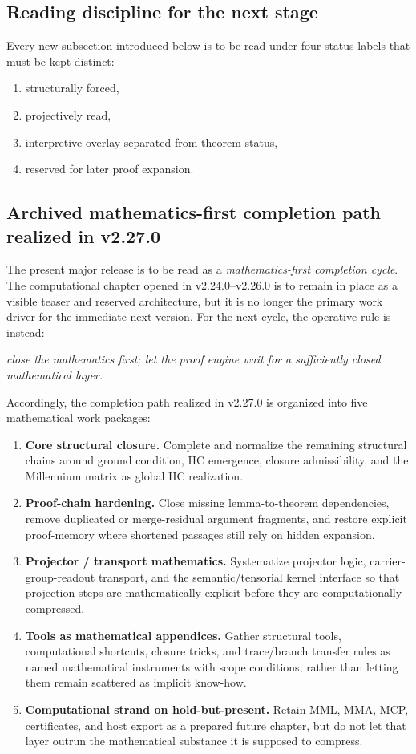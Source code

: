 \subsection*{Reading discipline for the next stage}
Every new subsection introduced below is to be read under four status labels that must be kept distinct:
\begin{enumerate}[leftmargin=2em,label=(\alph*)]
  \item structurally forced,
  \item projectively read,
  \item interpretive overlay separated from theorem status,
  \item reserved for later proof expansion.
\end{enumerate}


\subsection*{Archived mathematics-first completion path realized in v2.27.0}

The present major release is to be read as a \emph{mathematics-first completion cycle}. The computational chapter opened in v2.24.0--v2.26.0 is to remain in place as a visible teaser and reserved architecture, but it is no longer the primary work driver for the immediate next version. For the next cycle, the operative rule is instead:
\begin{center}
\emph{close the mathematics first; let the proof engine wait for a sufficiently closed mathematical layer.}
\end{center}

Accordingly, the completion path realized in v2.27.0 is organized into five mathematical work packages:
\begin{enumerate}[leftmargin=2em,label=\textbf{WP\arabic*:}]
  \item \textbf{Core structural closure.} Complete and normalize the remaining structural chains around ground condition, HC emergence, closure admissibility, and the Millennium matrix as global HC realization.
  \item \textbf{Proof-chain hardening.} Close missing lemma-to-theorem dependencies, remove duplicated or merge-residual argument fragments, and restore explicit proof-memory where shortened passages still rely on hidden expansion.
  \item \textbf{Projector / transport mathematics.} Systematize projector logic, carrier-group-readout transport, and the semantic/tensorial kernel interface so that projection steps are mathematically explicit before they are computationally compressed.
  \item \textbf{Tools as mathematical appendices.} Gather structural tools, computational shortcuts, closure tricks, and trace/branch transfer rules as named mathematical instruments with scope conditions, rather than letting them remain scattered as implicit know-how.
  \item \textbf{Computational strand on hold-but-present.} Retain MML, MMA, MCP, certificates, and host export as a prepared future chapter, but do not let that layer outrun the mathematical substance it is supposed to compress.
\end{enumerate}

